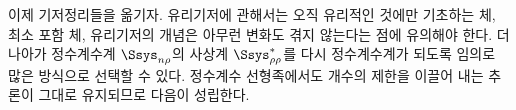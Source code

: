 
이제 기저정리들을 옮기자. 유리기저에 관해서는 오직 \glqq{}유리적인 것\grqq{}에만 기초하는 체, 최소 포함 체, 유리기저의 개념은 아무런 변화도 겪지 않는다는 점에 유의해야 한다. 더 나아가 정수계수계 $\Ssys_{n\rho}$의 사상계 $\Ssys^*_{\rho\rho}$를 다시 정수계수계가 되도록 임의로 많은 방식으로 선택할 수 있다. 정수계수 선형족에서도 개수의 제한을 이끌어 내는 추론이 그대로 유지되므로 다음이 성립한다.
